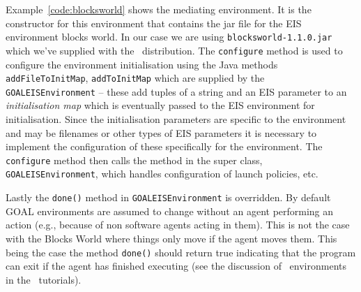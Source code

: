 Example~\ref{code:blocksworld} shows the mediating environment.  It is the constructor for this environment that contains the jar file for the EIS environment blocks world.  In our case we are using \texttt{blocksworld-1.1.0.jar} which we've supplied with the \mcapl\ distribution.  The \texttt{configure} method is used to configure the environment initialisation using the Java methods \texttt{addFileToInitMap}, \texttt{addToInitMap} which are supplied by the \texttt{GOALEISEnvironment} -- these add tuples of a string and an EIS parameter to an \emph{initialisation map} which is eventually passed to the EIS environment for initialisation.  Since the initialisation parameters are specific to the environment and may be filenames or other types of EIS parameters it is necessary to implement the configuration of these specifically for the environment.  The \texttt{configure} method then calls the method in the super class, \texttt{GOALEISEnvironment}, which handles configuration of launch policies, etc.

Lastly the \texttt{done()} method in \texttt{GOALEISEnvironment} is overridden.  By default GOAL environments are assumed to change without an agent performing an action (e.g., because of non software agents acting in them).  This is not the case with the Blocks World where things only move if the agent moves them.  This being the case the method \texttt{done()} should return true indicating that the program can exit if the agent has finished executing (see the discussion of \ail\ environments in the \ail\ tutorials).

